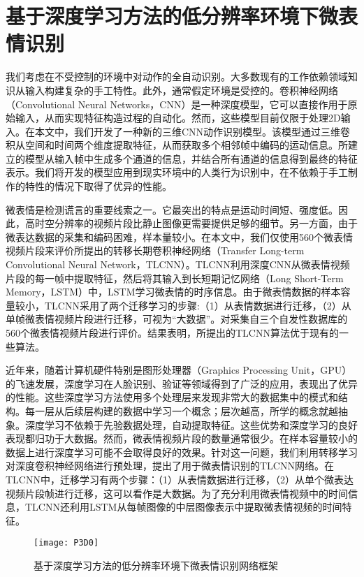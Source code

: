 \chapter{基于深度学习方法的低分辨率环境下微表情识别}\label{chap:owner2}

我们考虑在不受控制的环境中对动作的全自动识别。大多数现有的工作依赖领域知识从输入构建复杂的手工特性。此外，通常假定环境是受控的。卷积神经网络（Convolutional Neural Networks，CNN）是一种深度模型，它可以直接作用于原始输入，从而实现特征构造过程的自动化。然而，这些模型目前仅限于处理2D输入。在本文中，我们开发了一种新的三维CNN动作识别模型。该模型通过三维卷积从空间和时间两个维度提取特征，从而获取多个相邻帧中编码的运动信息。所建立的模型从输入帧中生成多个通道的信息，并结合所有通道的信息得到最终的特征表示。我们将开发的模型应用到现实环境中的人类行为识别中，在不依赖于手工制作的特性的情况下取得了优异的性能。

微表情是检测谎言的重要线索之一。它最突出的特点是运动时间短、强度低。因此，高时空分辨率的视频片段比静止图像更需要提供足够的细节。另一方面，由于微表达数据的采集和编码困难，样本量较小。在本文中，我们仅使用560个微表情视频片段来评价所提出的转移长期卷积神经网络（Transfer Long-term Convolutional Neural Network，TLCNN）。TLCNN利用深度CNN从微表情视频片段的每一帧中提取特征，然后将其输入到长短期记忆网络（Long Short-Term Memory，LSTM）中，LSTM学习微表情的时序信息。由于微表情数据的样本容量较小，TLCNN采用了两个迁移学习的步骤:（1）从表情数据进行迁移，（2）从单帧微表情视频片段进行迁移，可视为“大数据”。对采集自三个自发性数据库的560个微表情视频片段进行评价。结果表明，所提出的TLCNN算法优于现有的一些算法。

近年来，随着计算机硬件特别是图形处理器（Graphics Processing Unit，GPU）的飞速发展，深度学习在人脸识别、验证等领域得到了广泛的应用，表现出了优异的性能。这些深度学习方法使用多个处理层来发现非常大的数据集中的模式和结构。每一层从后续层构建的数据中学习一个概念；层次越高，所学的概念就越抽象。深度学习不依赖于先验数据处理，自动提取特征。这些优势和深度学习的良好表现都归功于大数据。然而，微表情视频片段的数量通常很少。在样本容量较小的数据上进行深度学习可能不会取得良好的效果。针对这一问题，我们利用转移学习对深度卷积神经网络进行预处理，提出了用于微表情识别的TLCNN网络。在TLCNN中，迁移学习有两个步骤：（1）从表情数据进行迁移，（2）从单个微表达视频片段帧进行迁移，这可以看作是大数据。为了充分利用微表情视频中的时间信息，TLCNN还利用LSTM从每帧图像的中层图像表示中提取微表情视频的时间特征。

\begin{figure}[!htb]
\centering
\texttt{[image: P3D0]}
\caption{基于深度学习方法的低分辨率环境下微表情识别网络框架}
\label{fig20}
\end{figure}

